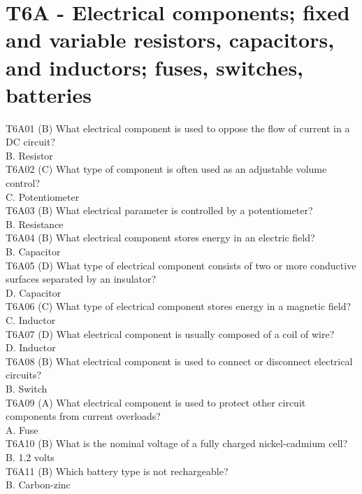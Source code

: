 \documentclass[12pt,letterpaper]{report}
\begin{document}
\section{T6A - Electrical components; fixed and variable resistors, capacitors, and inductors; fuses, switches, batteries}

T6A01 (B) What electrical component is used to oppose the flow of current in a DC circuit?\\
B. Resistor\\

T6A02 (C) What type of component is often used as an adjustable volume control?\\
C. Potentiometer\\

T6A03 (B) What electrical parameter is controlled by a potentiometer?\\
B. Resistance\\

T6A04 (B) What electrical component stores energy in an electric field?\\
B. Capacitor\\

T6A05 (D) What type of electrical component consists of two or more conductive surfaces separated by an insulator?\\
D. Capacitor\\

T6A06 (C) What type of electrical component stores energy in a magnetic field?\\
C. Inductor\\

T6A07 (D) What electrical component is usually composed of a coil of wire?\\
D. Inductor\\

T6A08 (B) What electrical component is used to connect or disconnect electrical circuits?\\
B. Switch\\

T6A09 (A) What electrical component is used to protect other circuit components from current overloads?\\
A. Fuse\\

T6A10 (B) What is the nominal voltage of a fully charged nickel-cadmium cell?\\
B. 1.2 volts\\

T6A11 (B) Which battery type is not rechargeable?\\
B. Carbon-zinc\\
\end{document}
